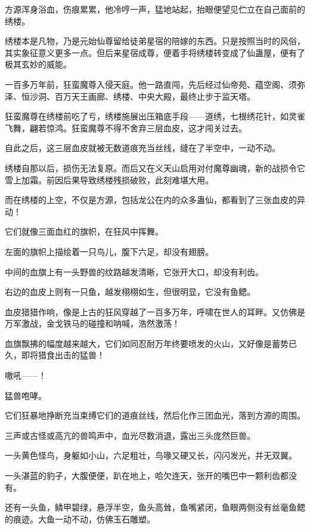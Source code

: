 
\begin{this_body}

方源浑身浴血，伤痕累累，他冷哼一声，猛地站起，抬眼便望见伫立在自己面前的绣楼。

绣楼本是凡物，乃是元始仙尊留给徒弟星宿的陪嫁的东西。只是按照当时的风俗，其实象征意义更多一点。但后来星宿成尊，便着手将绣楼转变成了仙蛊屋，便有了极其玄妙的威能。

一百多万年前，狂蛮魔尊入侵天庭。他一路直闯，先后经过仙帝苑、蕴空阁、须弥泽、恒沙洞、百万天王画廊、绣楼、中央大殿，最终止步于监天塔。

狂蛮魔尊在绣楼前吃了亏，绣楼施展出压箱底手段——道绣，七根绣花针，如灵雀飞舞，翩若惊鸿。狂蛮魔尊不得不舍弃三层血皮，这才闯关过去。

自此之后，这三层血皮就被无数道痕充当丝线，缝在了半空中，一动不动。

绣楼自那以后，损伤无法复原。而后又在义天山启用对付魔尊幽魂，新的战损令它雪上加霜。前因后果导致绣楼残损破败，此刻难堪大用。

而在绣楼的上空，不仅是方源，包括龙公在内的众多蛊仙，都看到了三张血皮的异动！

它们就像三面血红的旗帜，在狂风中挥舞。

左面的旗帜上描绘着一只鸟儿，腹下六足，却没有翅膀。

中间的血旗上有一头野兽的纹路越发清晰，它张开大口，却没有利齿。

右边的血皮上则有一只鱼，越发栩栩如生，但很明显，它没有鱼鳃。

血皮猎猎作响，像是上古的狂风穿越了一百多万年，呼啸在世人的耳畔。又仿佛是万军激战，金戈铁马的碰撞和呐喊，浩然激荡！

血旗飘拂的幅度越来越大，它们如同忍耐万年终要喷发的火山，又好像是蓄势已久，即将猎食出击的猛兽！

嗷吼——！

猛兽咆哮。

它们狂暴地挣断充当束缚它们的道痕丝线，然后化作三团血光，落到方源的周围。

三声或古怪或高亢的兽鸣声中，血光尽数消退，露出三头庞然巨兽。

一头黄色怪鸟，身躯如小山，六足粗壮，鸟喙又硬又长，闪闪发光，并无双翼。

一头湛蓝的豹子，大腹便便，趴在地上，哈欠连天，张开的嘴巴中一颗利齿都没有。

还有一头鱼，鳞甲碧绿，悬浮半空，鱼头高耸，鱼嘴紧闭，鱼眼两侧没有丝毫鱼鳃的痕迹。大鱼一动不动，仿佛玉石雕塑。


\end{this_body}

